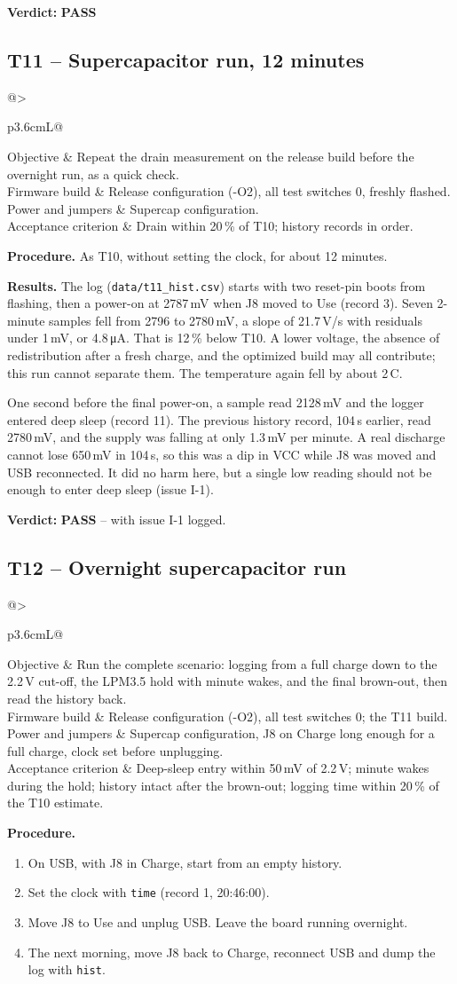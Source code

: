\documentclass[11pt,a4paper]{article}
\makeatletter
\newcommand{\uA}{\,\si{\micro\ampere}}
\newcommand{\code}[1]{\texttt{#1}}
\newcommand{\pass}{\textbf{\textcolor{green!45!black}{PASS}}}
\newcommand{\testcase}[7]{%
  \subsection{#1 -- #2}\label{#3}
  \noindent\begin{tabularx}{\textwidth}{@{}>{\raggedright\arraybackslash\bfseries}p{3.6cm}L@{}}
  \toprule
  Objective & #4 \\
  Firmware build & #5 \\
  Power and jumpers & #6 \\
  Acceptance criterion & #7 \\
  \bottomrule
  \end{tabularx}\par\medskip}
\makeatother
\begin{document}
\textbf{Verdict:} \pass

\testcase{T11}{Supercapacitor run, 12 minutes}{t:drain12}
  {Repeat the drain measurement on the release build before the overnight run, as a quick check.}
  {Release configuration (-O2), all test switches 0, freshly flashed.}
  {Supercap configuration.}
  {Drain within 20\,\% of T10; history records in order.}

\textbf{Procedure.} As T10, without setting the clock, for about 12 minutes.

\textbf{Results.} The log (\code{data/t11\_hist.csv}) starts with two reset-pin boots from flashing, then a power-on at 2787\,mV when J8 moved to Use (record 3). Seven 2-minute samples fell from 2796 to 2780\,mV, a slope of 21.7\,\textmu V/s with residuals under 1\,mV, or 4.8\uA. That is 12\,\% below T10. A lower voltage, the absence of redistribution after a fresh charge, and the optimized build may all contribute; this run cannot separate them. The temperature again fell by about 2\,\textdegree C.

One second before the final power-on, a sample read 2128\,mV and the logger entered deep sleep (record 11). The previous history record, 104\,s earlier, read 2780\,mV, and the supply was falling at only 1.3\,mV per minute. A real discharge cannot lose 650\,mV in 104\,s, so this was a dip in VCC while J8 was moved and USB reconnected. It did no harm here, but a single low reading should not be enough to enter deep sleep (issue I-1).

\textbf{Verdict:} \pass{} -- with issue I-1 logged.

\testcase{T12}{Overnight supercapacitor run}{t:drainfull}
  {Run the complete scenario: logging from a full charge down to the 2.2\,V cut-off, the LPM3.5 hold with minute wakes, and the final brown-out, then read the history back.}
  {Release configuration (-O2), all test switches 0; the T11 build.}
  {Supercap configuration, J8 on Charge long enough for a full charge, clock set before unplugging.}
  {Deep-sleep entry within 50\,mV of 2.2\,V; minute wakes during the hold; history intact after the brown-out; logging time within 20\,\% of the T10 estimate.}

\textbf{Procedure.}
\begin{enumerate}
  \item On USB, with J8 in Charge, start from an empty history.
  \item Set the clock with \code{time} (record 1, 20:46:00).
  \item Move J8 to Use and unplug USB. Leave the board running overnight.
  \item The next morning, move J8 back to Charge, reconnect USB and dump the log with \code{hist}.
\end{enumerate}
\end{document}
